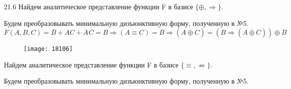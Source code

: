 \documentclass[]{article}
\begin{document}
	21.6 Найдем аналитическое представление функции F в базисе $\{\oplus,\Rightarrow\}$.
	
	Будем преобразовывать минимальную дизъюнктивную форму, полученную в №5.
	\[
	F(A,B,C)=\overline{B} +AC+ \overline{A}\hspace{1pt}\overline{C}=B\Rightarrow(A\equiv C)
	=B\Rightarrow(\overline{A\oplus C})=(B\Rightarrow(\overline{A\oplus C}))\oplus B
	\] 
	\begin{figure}[h!]
		\centering
		\texttt{[image: 18106]}
	\end{figure}

	 Найдем аналитическое представление функции F в базисе $\{\equiv,\nRightarrow\}$.
	
	Будем преобразовывать минимальную дизъюнктивную форму, полученную в №5.
	\newpage
	
\end{document}
